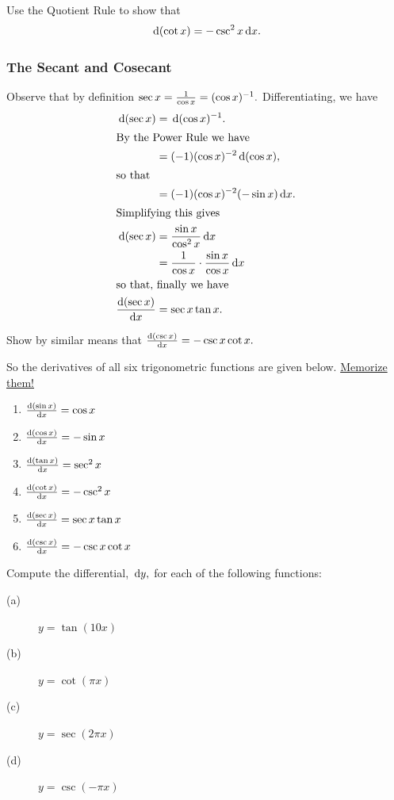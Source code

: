 \begin{embeddedproblem}{}
  Use the Quotient Rule to show that 
\[
\thinspace{\rm d}(\cot x) = -\csc^2x\thinspace{\rm d}x.
\]
\end{embeddedproblem}

\subsubsection*{The Secant and Cosecant}

Observe that by definition \(\sec x = \frac{1}{\cos x} = (\cos
  x)^{-1}.\) Differentiating, we have
\begin{align*}
  \thinspace{\rm d}(\sec x) &= \thinspace{\rm d}(\cos  x)^{-1}.\\
\intertext{By the Power Rule we have}
             &=(-1)(\cos x)^{-2}\thinspace{\rm d}(\cos x),\\
\intertext{so that}
             &= (-1)(\cos x)^{-2}(-\sin x)\thinspace{\rm d}x.\\
\intertext{Simplifying this gives}
  \thinspace{\rm d}(\sec x) &= \frac{\sin x}{\cos^2x}\thinspace{\rm d}x\\
  &= \frac{1}{\cos x}\cdot\frac{\sin x}{\cos x}\thinspace{\rm d}x\\
\intertext{so that, finally we have}
\frac{\text{d}{(\sec x)}}{\text{d}{x}}   &= \sec x\tan x.
\end{align*}

\begin{embeddedproblem}{}
  Show by similar means that \(\frac{\text{d}{(\csc x)}}{\text{d}{x}} = -\csc x\cot x.\)
\end{embeddedproblem}

So the derivatives of all six trigonometric functions are given
below. \underline{\sc Memorize them!}
\begin{enumerate}
\item $\frac{\text{d}{ (\sin x)}}{\text{d}{x}} = \cos x $
\item $\frac{\text{d}{ (\cos x)}}{\text{d}{x}} = -\sin x $
\item $\frac{\text{d}{ (\tan x)}}{\text{d}{x}} = \sec^2 x $
\item $\frac{\text{d}{ (\cot x)}}{\text{d}{x}} = -\csc^2 x $
\item $\frac{\text{d}{ (\sec x)}}{\text{d}{x}} = \sec x\tan x $
\item $\frac{\text{d}{ (\csc x)}}{\text{d}{x}} = -\csc x\cot x $
\end{enumerate}


\begin{ProblemSection}
  Compute the differential, $\thinspace{\rm d}y,$ for each of the following functions:
  \begin{multicols}{4}
    \begin{description}
    \item[(a)] $y=\tan(10x)$
    \item[(b)] $y=\cot(\pi x)$
    \item[(c)] $y=\sec(2\pi x)$
    \item[(d)] $y=\csc(-\pi x)$
    \end{description}
  \end{multicols}
\end{ProblemSection}

